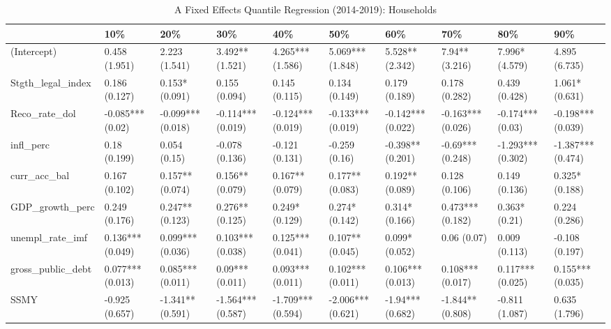 \begin{table}[ht]
\centering
\caption{A Fixed Effects Quantile Regression (2014-2019): Households} 
\begingroup\small
\begin{tabular}{llllllllll}
  \toprule
 & 10\% & 20\% & 30\% & 40\% & 50\% & 60\% & 70\% & 80\% & 90\% \\ 
  \midrule
(Intercept) & 0.458 (1.951) & 2.223 (1.541) & 3.492** (1.521) & 4.265*** (1.586) & 5.069*** (1.848) & 5.528** (2.342) & 7.94** (3.216) & 7.996* (4.579) & 4.895 (6.735) \\ 
  Stgth\_legal\_index & 0.186 (0.127) & 0.153* (0.091) & 0.155 (0.094) & 0.145 (0.115) & 0.134 (0.149) & 0.179 (0.189) & 0.178 (0.282) & 0.439 (0.428) & 1.061* (0.631) \\ 
  Reco\_rate\_dol & -0.085*** (0.02) & -0.099*** (0.018) & -0.114*** (0.019) & -0.124*** (0.019) & -0.133*** (0.019) & -0.142*** (0.022) & -0.163*** (0.026) & -0.174*** (0.03) & -0.198*** (0.039) \\ 
  infl\_perc & 0.18 (0.199) & 0.054 (0.15) & -0.078 (0.136) & -0.121 (0.131) & -0.259 (0.16) & -0.398** (0.201) & -0.69*** (0.248) & -1.293*** (0.302) & -1.387*** (0.474) \\ 
  curr\_acc\_bal & 0.167 (0.102) & 0.157** (0.074) & 0.156** (0.079) & 0.167** (0.079) & 0.177** (0.083) & 0.192** (0.089) & 0.128 (0.106) & 0.149 (0.136) & 0.325* (0.188) \\ 
  GDP\_growth\_perc & 0.249 (0.176) & 0.247** (0.123) & 0.276** (0.125) & 0.249* (0.129) & 0.274* (0.142) & 0.314* (0.166) & 0.473*** (0.182) & 0.363* (0.21) & 0.224 (0.286) \\ 
  unempl\_rate\_imf & 0.136*** (0.049) & 0.099*** (0.036) & 0.103*** (0.038) & 0.125*** (0.041) & 0.107** (0.045) & 0.099* (0.052) & 0.06 (0.07) & 0.009 (0.113) & -0.108 (0.197) \\ 
  gross\_public\_debt & 0.077*** (0.013) & 0.085*** (0.011) & 0.09*** (0.011) & 0.093*** (0.011) & 0.102*** (0.011) & 0.106*** (0.013) & 0.108*** (0.017) & 0.117*** (0.025) & 0.155*** (0.035) \\ 
  SSMY & -0.925 (0.657) & -1.341** (0.591) & -1.564*** (0.587) & -1.709*** (0.594) & -2.006*** (0.621) & -1.94*** (0.682) & -1.844** (0.808) & -0.811 (1.087) & 0.635 (1.796) \\ 
   \bottomrule
\end{tabular}
\endgroup
\end{table}
